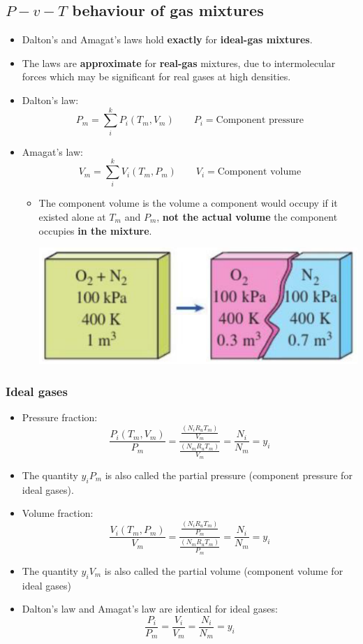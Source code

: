 \documentclass[11pt]{article}
\begin{document}
\subsection{\(P-v-T\) behaviour of gas mixtures}
\label{sec:orgf580db6}
\begin{itemize}
\item Dalton's and Amagat's laws hold \textbf{exactly} for \textbf{ideal-gas mixtures}.
\item The laws are \textbf{approximate} for \textbf{real-gas} mixtures, due to intermolecular forces which may be significant for real gases at high densities.
\item Dalton's law:
\[P_m = \sum_i^k P_i (T_m, V_m) \qquad P_i = \text{Component pressure}\]
\item Amagat's law:
\[V_m = \sum_i^k V_i (T_m, P_m) \qquad V_i = \text{Component volume}\]
\begin{itemize}
\item The component volume is the volume a component would occupy if it existed alone at \(T_m\) and \(P_m\), \textbf{not the actual volume} the component occupies \textbf{in the mixture}.
\begin{center}
\includegraphics[width=.9\linewidth]{./images/component-volume-diagram.png}
\end{center}
\end{itemize}
\end{itemize}

 \newpage
\subsubsection{Ideal gases}
\label{sec:org65d72d2}
\begin{itemize}
\item Pressure fraction:
\[\frac{P_i(T_m, V_m)}{P_m} = \frac{\frac{(N_i R_u T_m)}{V_m}}{\frac{(N_m R_u T_m)}{V_m}} = \frac{N_i}{N_m} = y_i\]
\item The quantity \(y_i P_m\) is also called the partial pressure (component pressure for ideal gases).
\item Volume fraction:
\[\frac{V_i(T_m, P_m)}{V_m} = \frac{\frac{(N_i R_u T_m)}{P_m}}{\frac{(N_m R_u T_m)}{P_m}} = \frac{N_i}{N_m} = y_i\]
\item The quantity \(y_i V_m\) is also called the partial volume (component volume for ideal gases)
\item Dalton's law and Amagat's law are identical for ideal gases:
\[\frac{P_i}{P_m} = \frac{V_i}{V_m} = \frac{N_i}{N_m} = y_i\]
\end{itemize}
\end{document}
